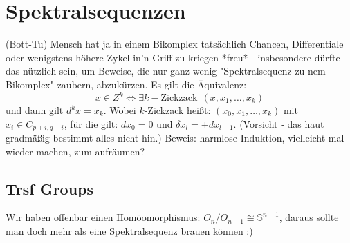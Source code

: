 \documentclass[11pt,twoside,a4paper]{scrbook} %
\begin{document}
\section{Spektralsequenzen}
(Bott-Tu) Mensch hat ja in einem Bikomplex tats\"achlich Chancen, Differentiale oder wenigstens h\"ohere Zykel in'n Griff zu kriegen *freu* - insbesondere d\"urfte das n\"utzlich sein, um
Beweise, die nur ganz wenig "Spektralsequenz zu nem Bikomplex" zaubern, abzuk\"urzen. Es gilt die \"Aquivalenz:
$$x\in Z^k\Leftrightarrow \exists k-\mathrm{Zickzack} ~~(x,x_1,\ldots,x_k)$$
und dann gilt $d^k x = x_k$. Wobei $k$-Zickzack hei\ss t: $(x_0,x_1,\ldots,x_k)$ mit $x_i\in C_{p+i,q-i}$, f\"ur die gilt: $dx_0 = 0$ und $\delta x_l = \pm dx_{l+1}$.
(Vorsicht - das haut gradm\"a\ss ig bestimmt alles nicht hin.) Beweis: harmlose Induktion, vielleicht mal wieder machen, zum aufr\"aumen?
\subsection{Trsf Groups}
Wir haben offenbar einen Hom\"oomorphismus: $O_n/O_{n-1}\cong \mathbb{S}^{n-1}$, daraus sollte man doch mehr als eine Spektralsequenz brauen k\"onnen :)
\end{document}
